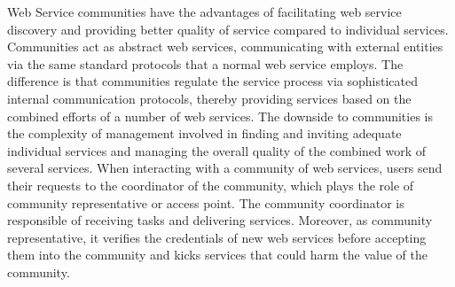Web Service communities have the advantages of facilitating web service discovery and providing better quality of service compared to individual services. Communities act as abstract web services, communicating with external entities via the same standard protocols that a normal web service employs. The difference is that communities regulate the service process via sophisticated internal communication protocols, thereby providing services based on the combined efforts of a number of web services. The downside to communities is the complexity of management involved in finding and inviting adequate individual services and managing the overall quality of the combined work of several services.
When interacting with a community of web services, users send their requests to the coordinator of the community, which plays the role of community representative or access point. The community coordinator is responsible of receiving tasks and delivering services. Moreover, as community representative, it verifies the credentials of new web services before accepting them into the community and kicks services that could harm the value of the community.

